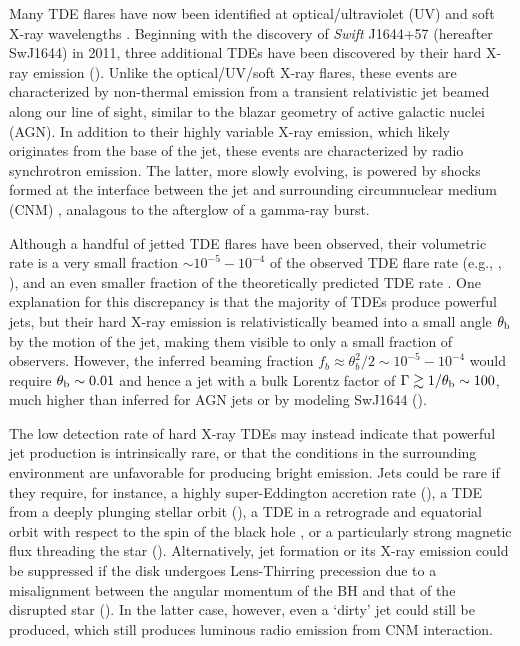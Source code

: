 \documentclass[usenatbib,fleqn]{mnras}
\begin{document}
Many TDE flares have now been identified at optical/ultraviolet (UV)
\citep{Gezari+2008, Gezari+2009, van-Velzen+2011, Gezari+2012,
  Arcavi+2014, Chornock+2014, Holoien+2014, Vinko+2015, Holoien+2016}
and soft X-ray wavelengths \citep{Bade+1996, Grupe+1999,
  Komossa&Greiner1999, Greiner+2000, Esquej+2007, Maksym+2010,
  Saxton+2012}. Beginning with the discovery of {\it Swift} J1644+57
(hereafter SwJ1644) in 2011, three additional TDEs have been
discovered by their hard X-ray emission (\citealt{Bloom+2011,
  Levan+2011, Burrows+2011, Zauderer+2011, Cenko+2012, Pasham+2015,
  Brown+2015}).  Unlike the optical/UV/soft X-ray flares, these events
are characterized by non-thermal emission from a transient
relativistic jet beamed along our line of sight, similar to the blazar
geometry of active galactic nuclei (AGN).  In addition to their highly
variable X-ray emission, which likely originates from the base of the
jet, these events are characterized by radio synchrotron emission.
The latter, more slowly evolving, is powered by shocks formed at the
interface between the jet and surrounding circumnuclear medium (CNM)
\citep{Bloom+2011,Giannios&Metzger2011,Metzger+2012,De-Colle+2012,Kumar+13,Mimica+2015},
analagous to the afterglow of a gamma-ray burst.

Although a handful of jetted TDE flares have been observed, their
volumetric rate is a very small fraction $\sim 10^{-5}-10^{-4}$ of the
observed TDE flare rate (e.g., \citealt{Burrows+2011},
\citealt{Brown+2015}), and an even smaller fraction of the
theoretically predicted TDE rate
\citep{Wang&Merritt2004,Stone&Metzger2016}.  One explanation for this
discrepancy is that the majority of TDEs produce powerful jets, but
their hard X-ray emission is relativistically beamed into a small
angle $\theta_{\rm b}$ by the motion of the jet, making them
visible to only a small fraction of observers.  However, the inferred
beaming fraction $f_b \approx \theta_{b}^{2}/2 \sim 10^{-5}-10^{-4}$
would require $\theta_{\rm b} \sim 0.01$ and hence a jet with a bulk
Lorentz factor of $\Gamma \gtrsim 1/\theta_{\rm b} \sim 100$, much
higher than inferred for AGN jets or by modeling SwJ1644
(\citealt{Metzger+2012}).

The low detection rate of hard X-ray TDEs may instead indicate that powerful
jet production is intrinsically rare, or that the conditions in
the surrounding environment are unfavorable for producing bright
emission.  Jets could be rare if they require, for instance, a highly
super-Eddington accretion rate (\citealt{De-Colle+2012}), a TDE from a
deeply plunging stellar orbit (\citealt{Metzger&Stone2015}), a TDE in
a retrograde and equatorial orbit with respect to the spin of the
black hole \citep{Parfrey+2015}, or a particularly strong magnetic
flux threading the star (\citealt{Tchekhovskoy+2014,Kelley+2014}).
Alternatively, jet formation or its X-ray emission could be suppressed
if the disk undergoes Lens-Thirring precession due to a misalignment
between the angular momentum of the BH and that of the disrupted star
(\citealt{Stone&Loeb2012}).  In the latter case, however, even a
`dirty' jet could still be produced, which still produces luminous
radio emission from CNM interaction.
\end{document}
